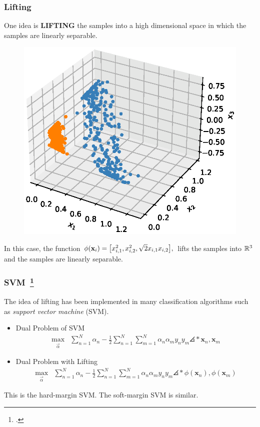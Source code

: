 \documentclass[10pt]{../formats/RU}
\begin{document}
\begin{frame}
  \frametitle{Lifting}
  One idea is \textbf{LIFTING} the samples into a high dimensional space in which the samples are linearly separable.
  \begin{figure}
    \includegraphics[height=0.45\textheight]{./figs/3d_poly_circle.eps}%
  \end{figure}
  In this case, the function
  $
  \phi(\mathbf{x}_i) = \bracks*{x_{i,1}^2 , x_{i,2}^2 , \sqrt{2}x_{i,1}x_{i,2}},
  $
  lifts the samples into $\mathbb{R}^3$ and the samples are linearly separable.
\end{frame}
\begin{frame}
  \frametitle{SVM~\footcite{boyd2004convex}}
  The idea of lifting has been implemented in many classification algorithms such as \emph{support vector machine} (SVM).
  \begin{itemize}
    \item Dual Problem of SVM{
      \begin{align*}
        \max_{\vec{\alpha}} &\sum_{n=1}^N\alpha_n - \frac{1}{2}\sum_{n=1}^{N}\sum_{m=1}^{N}\alpha_n\alpha_m y_ny_m\angles*{\mathbf{x}_n, \mathbf{x}_m}
      \end{align*}
    }
    \item Dual Problem with Lifting {
      \begin{align*}
        \max_{\vec{\alpha}} &\sum_{n=1}^N\alpha_n - \frac{1}{2}\sum_{n=1}^{N}\sum_{m=1}^{N}\alpha_n\alpha_m y_ny_m\angles*{\phi(\mathbf{x}_n), \phi(\mathbf{x}_m)}
      \end{align*}
    }
  \end{itemize}
  This is the hard-margin SVM. The soft-margin SVM is similar.
\end{frame}
\end{document}
